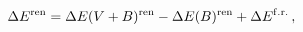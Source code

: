 \begin{equation}
\Delta E^{\rm ren} = \Delta E(V+B)^{\rm ren} - \Delta E (B)^{\rm
ren} + \Delta E^{\rm f.r.} \,,\label{DE3DE}
\end{equation}

